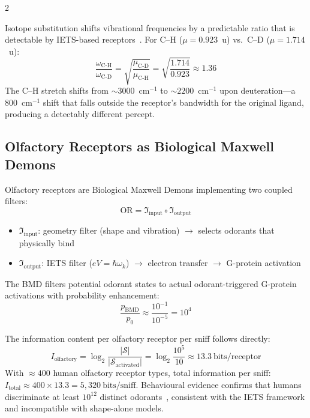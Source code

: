 \begin{multicols}{2}
\begin{proposition}
\label{prop:isotope}
Isotope substitution shifts vibrational frequencies by a predictable ratio
that is detectable by IETS-based receptors~\citep{dyson1938scientific,
turin2002mechanism}.  For C--H ($\mu = 0.923$~u) vs.\ C--D ($\mu = 1.714$~u):
\begin{equation}
\frac{\omega_{\text{C-H}}}{\omega_{\text{C-D}}}
  = \sqrt{\frac{\mu_{\text{C-D}}}{\mu_{\text{C-H}}}}
  = \sqrt{\frac{1.714}{0.923}} \approx 1.36
\end{equation}
The C--H stretch shifts from ${\sim}3000$~cm$^{-1}$ to ${\sim}2200$~cm$^{-1}$
upon deuteration---a 800~cm$^{-1}$ shift that falls outside the receptor's
bandwidth for the original ligand, producing a detectably different percept.
\end{proposition}

\subsection{Olfactory Receptors as Biological Maxwell Demons}
\label{ssec:olfactory_bmd}

\begin{theorem}
\label{thm:olfactory_bmd}
Olfactory receptors are Biological Maxwell Demons implementing two coupled
filters:
\begin{equation}
\text{OR} = \Im_{\text{input}} \circ \Im_{\text{output}}
\end{equation}
\begin{itemize}
\item $\Im_{\text{input}}$: geometry filter (shape and vibration)
  $\to$ selects odorants that physically bind
\item $\Im_{\text{output}}$: IETS filter ($eV = \hbar\omega_k$)
  $\to$ electron transfer $\to$ G-protein activation
\end{itemize}
The BMD filters potential odorant states to actual odorant-triggered
G-protein activations with probability enhancement:
\begin{equation}
\frac{p_{\text{BMD}}}{p_0} \approx \frac{10^{-1}}{10^{-5}} = 10^4
\end{equation}
\end{theorem}

The information content per olfactory receptor per sniff follows directly:
\begin{equation}
I_{\text{olfactory}} = \log_2\!\frac{|\mathcal{S}|}{|\mathcal{S}_{\text{activated}}|}
  = \log_2\!\frac{10^5}{10} \approx 13.3~\text{bits/receptor}
\end{equation}
With ${\approx}400$ human olfactory receptor types, total information per sniff:
$I_{\text{total}} \approx 400 \times 13.3 = 5{,}320~\text{bits/sniff}$.
Behavioural evidence confirms that humans discriminate at least $10^{12}$
distinct odorants~\citep{bushdid2014humans}, consistent with the IETS
framework and incompatible with shape-alone models.


\end{multicols}
